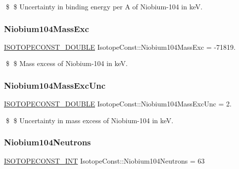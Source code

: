 \$ \$ Uncertainty in binding energy per A of Niobium-\/104 in keV. \mbox{\label{group___isotope_const-_niobium-_nb104_ga067e52482141dd57fbad6f90f93b2134}} 
\subsubsection{\texorpdfstring{Niobium104\+Mass\+Exc}{Niobium104MassExc}}
{\footnotesize\ttfamily \mbox{\hyperlink{group___isotope_const-_macros_ga8f45a7272ce02c0b4c65c44636ed719a}{I\+S\+O\+T\+O\+P\+E\+C\+O\+N\+S\+T\+\_\+\+D\+O\+U\+B\+LE}} Isotope\+Const\+::\+Niobium104\+Mass\+Exc = -\/71819.}

\$ \$ Mass excess of Niobium-\/104 in keV. \mbox{\label{group___isotope_const-_niobium-_nb104_gaf9b4e6711942aa9c4f66b31b9e8cea63}} 
\subsubsection{\texorpdfstring{Niobium104\+Mass\+Exc\+Unc}{Niobium104MassExcUnc}}
{\footnotesize\ttfamily \mbox{\hyperlink{group___isotope_const-_macros_ga8f45a7272ce02c0b4c65c44636ed719a}{I\+S\+O\+T\+O\+P\+E\+C\+O\+N\+S\+T\+\_\+\+D\+O\+U\+B\+LE}} Isotope\+Const\+::\+Niobium104\+Mass\+Exc\+Unc = 2.}

\$ \$ Uncertainty in mass excess of Niobium-\/104 in keV. \mbox{\label{group___isotope_const-_niobium-_nb104_ga0e5519ee6c0ca4fab7f4f221381961f0}} 
\subsubsection{\texorpdfstring{Niobium104\+Neutrons}{Niobium104Neutrons}}
{\footnotesize\ttfamily \mbox{\hyperlink{group___isotope_const-_macros_ga5f18360b3e99483a35c32d789e62621c}{I\+S\+O\+T\+O\+P\+E\+C\+O\+N\+S\+T\+\_\+\+I\+NT}} Isotope\+Const\+::\+Niobium104\+Neutrons = 63}

